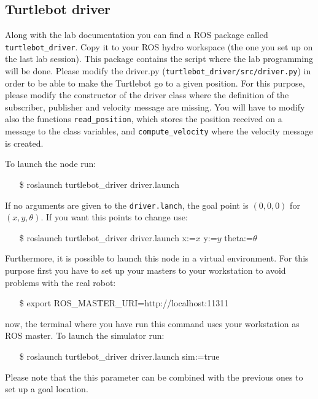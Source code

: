 \documentclass[a4paper,10pt]{article}
\begin{document}
\subsection{Turtlebot driver}
Along with the lab documentation you can find a ROS package called \texttt{turtlebot\_driver}. Copy it to your ROS hydro workspace (the one you set up on the last lab session). This package contains the script where the lab programming will be done. Please modify the driver.py (\texttt{turtlebot\_driver/src/driver.py}) in order to be able to make the Turtlebot go to a given position. For this purpose, please modify the constructor of the driver class where the definition of the subscriber, publisher and velocity message are missing. You will have to modify also the functions \texttt{read\_position}, which stores the position received on a message to the class variables, and \texttt{compute\_velocity} where the velocity message is created.

To launch the node run:
\begin{shaded}
	\begin{itemize}
		\item[\$] roslaunch turtlebot\_driver driver.launch
	\end{itemize}
\end{shaded}
If no arguments are given to the \texttt{driver.lanch}, the goal point is $(0,0,0)$ for $(x,y,\theta)$. If you want this points to change use:
\begin{shaded}
	\begin{itemize}
		\item[\$] roslaunch turtlebot\_driver driver.launch x:=$x$ y:=$y$ theta:=$\theta$
	\end{itemize}
\end{shaded}
Furthermore, it is possible to launch this node in a virtual environment. For this purpose first you have to set up your masters to your workstation to avoid problems with the real robot:
\begin{shaded}
	\begin{itemize}
		\item[\$] export ROS\_MASTER\_URI=http://localhost:11311
	\end{itemize}
\end{shaded}
now, the terminal where you have run this command uses your workstation as ROS master. To launch the simulator run:
\begin{shaded}
	\begin{itemize}
		\item[\$] roslaunch turtlebot\_driver driver.launch sim:=true
	\end{itemize}
\end{shaded}
Please note that the this parameter can be combined with the previous ones to set up a goal location.
\end{document}
